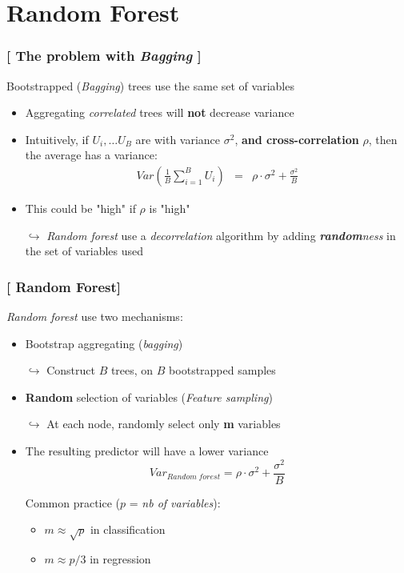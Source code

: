 \documentclass[xcolor=x11names,compress]{beamer}
\renewcommand{\(}{\begin{columns}}
\renewcommand{\)}{\end{columns}}
\newcommand{\<}[1]{\begin{column}{#1}}
\renewcommand{\>}{\end{column}}
\begin{document}

\section{Random Forest}


\begin{frame}
\frametitle{\textcolor{brique}{[ The problem with \textit{Bagging} ]}}
 Bootstrapped (\textit{Bagging}) trees use the same set of variables
\pause
\begin{itemize}[<+->]
    \item Aggregating  \textit{correlated} trees  will \textbf{not}  decrease variance
    \item   Intuitively, if $U_{i}, \ldots U_{B}$ are with variance $\sigma^{2}$, \textbf{and cross-correlation} $\rho$,   then the average has a variance:
\begin{eqnarray*}
Var \left( \frac{1}{B} \sum_{i=1}^{B} U_i \right)  &=&   \rho \cdot \sigma^{2} + \frac{\sigma^{2}}{B}
\end{eqnarray*}
    \item This could be "high" if $\rho$ is "high"
    \item[$\hookrightarrow$] \textit{Random forest }use a \textit{decorrelation} algorithm by adding \textit{\textbf{random}ness} in the set of variables used
\end{itemize}
\end{frame}

\begin{frame}
\frametitle{\textcolor{brique}{[ Random Forest]}}
\textit{Random forest} use two mechanisms:
\pause
\begin{itemize}[<+->]
    \item Bootstrap aggregating (\textit{bagging})
    \item[$\hookrightarrow$] Construct $B$ trees, on $B$ bootstrapped samples
    \item \textbf{Random} selection of variables (\textit{Feature sampling})
    \item[$\hookrightarrow$] At each node, randomly select only \textbf{m} variables
    \item The resulting predictor will have a lower variance
    $$
Var_{Random \; forest} = \rho \cdot \sigma^{2} + \frac{\sigma^{2}}{B}
$$

    \item[]Common practice ($p$ =\textit{ nb of variables}):
    \begin{itemize}
        \item $m \approx \sqrt{p}$ in classification
        \item $m \approx p/3$ in regression
    \end{itemize}
\end{itemize}
\end{frame}
\end{document}
